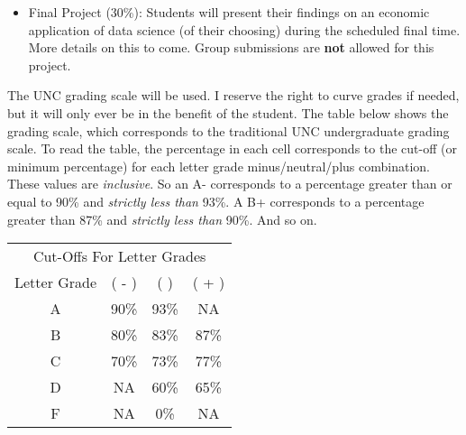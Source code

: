 \documentclass[11pt]{article}
\begin{document}
\begin{itemize}
    \item Final Project (30\%): Students will present their findings on an economic application of data science (of their choosing) during the scheduled final time. More details on this to come. Group submissions are \textbf{not} allowed for this project. 
\end{itemize}

The UNC grading scale will be used. I reserve the right to curve grades if needed, but it will only ever be in the benefit of the student. The table below shows the grading scale, which corresponds to the traditional UNC undergraduate grading scale. To read the table, the percentage in each cell corresponds to the cut-off (or minimum percentage) for each letter grade minus/neutral/plus combination. These values are \textit{inclusive}. So an A- corresponds to a percentage greater than or equal to 90\% and \textit{strictly less than} 93\%. A B+ corresponds to a percentage greater than 87\% and \textit{strictly less than} 90\%. And so on. 

\begin{table}[H]
\centering
\begin{tabular}{@{}cccc@{}} \toprule
\multicolumn{4}{c}{Cut-Offs For Letter Grades} \\ \cmidrule(r){1-4}
Letter Grade & ( - ) & (  ) & ( + ) \\ \midrule
A & 90\% & 93\% & NA \\ 
B & 80\% & 83\% & 87\% \\
C & 70\% & 73\% & 77\% \\
D & NA & 60\% & 65\% \\
F & NA & 0\% & NA \\ \bottomrule
\end{tabular}
\end{table}



  
\newpage


\end{document}
